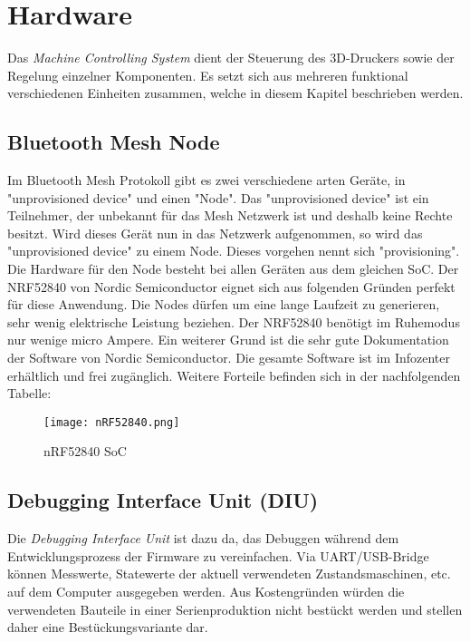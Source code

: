 \clearpage
\section{Hardware}\label{sec:Hardware}
Das \textit{Machine Controlling System} dient der Steuerung des 3D-Druckers sowie der Regelung einzelner Komponenten. Es setzt sich aus mehreren funktional verschiedenen Einheiten zusammen, welche in diesem Kapitel beschrieben werden.


\subsection{Bluetooth Mesh Node}\label{subsec:BMN}
Im Bluetooth Mesh Protokoll gibt es zwei verschiedene arten Geräte, in "unprovisioned device" und einen "Node". Das "unprovisioned device" ist ein Teilnehmer, der unbekannt für das Mesh Netzwerk ist und deshalb keine Rechte besitzt. Wird dieses Gerät nun in das Netzwerk aufgenommen, so wird das "unprovisioned device" zu einem Node. Dieses vorgehen nennt sich "provisioning". Die Hardware für den Node besteht bei allen Geräten aus dem gleichen SoC. Der NRF52840 von Nordic Semiconductor eignet sich aus folgenden Gründen perfekt für diese Anwendung. Die Nodes dürfen um eine lange Laufzeit zu generieren, sehr wenig elektrische Leistung beziehen. Der NRF52840 benötigt im Ruhemodus nur wenige micro Ampere. Ein weiterer Grund ist die sehr gute Dokumentation der Software von Nordic Semiconductor. Die gesamte Software ist im Infozenter erhältlich und frei zugänglich. Weitere Forteile befinden sich in der nachfolgenden Tabelle:

\begin{figure}[h]
	\centering
	\texttt{[image: nRF52840.png]}
	\caption{nRF52840 SoC}
	\label{img:nRF52840}
\end{figure} 

\subsection{Debugging Interface Unit (DIU)}\label{subsec:DIU}
Die \textit{Debugging Interface Unit} ist dazu da, das Debuggen während dem Entwicklungsprozess der Firmware zu vereinfachen. Via UART/USB-Bridge können Messwerte, Statewerte der aktuell verwendeten Zustandsmaschinen, etc. auf dem Computer ausgegeben werden. Aus Kostengründen würden die verwendeten Bauteile in einer Serienproduktion nicht bestückt werden und stellen daher eine Bestückungsvariante dar.

